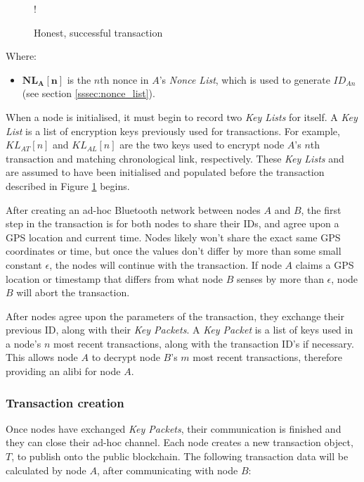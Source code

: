 \begin{figure}[H]
\resizebox {\columnwidth} {!} {}
\caption{Honest, successful transaction}
\label{fig:transaction}
\end{figure}

Where:
\begin{itemize}[noitemsep,topsep=0pt]
	\item[] $\mathbf{NL_A[n]}$ is the $n$th nonce in $A$'s \textit{Nonce List}, which is used to generate $ID_{An}$ (see section \ref{sssec:nonce_list}).
\end{itemize}

\null
When a node is initialised, it must begin to record two \textit{Key Lists} for itself. A \textit{Key List} is a list of encryption keys previously used for transactions. For example, $KL_{AT}[n]$ and $KL_{AL}[n]$ are the two keys used to encrypt node $A$'s $n$th transaction and matching chronological link, respectively. These \textit{Key Lists} and are assumed to have been initialised and populated before the transaction described in Figure \ref{fig:transaction} begins.

After creating an ad-hoc Bluetooth network between nodes $A$ and $B$, the first step in the transaction is for both nodes to share their IDs, and agree upon a GPS location and current time. Nodes likely won't share the exact same GPS coordinates or time, but once the values don't differ by more than some small constant $\epsilon$, the nodes will continue with the transaction. If node $A$ claims a GPS location or timestamp that differs from what node $B$ senses by more than $\epsilon$, node $B$ will abort the transaction.

After nodes agree upon the parameters of the transaction, they exchange their previous ID, along with their \textit{Key Packets}. A \textit{Key Packet} is a list of keys used in a node's $n$ most recent transactions, along with the transaction ID's if necessary. This allows node $A$ to decrypt node $B$'s $m$ most recent transactions, therefore providing an alibi for node $A$.

\subsubsection{Transaction creation}
Once nodes have exchanged \textit{Key Packets}, their communication is finished and they can close their ad-hoc channel. Each node creates a new transaction object, $T$, to publish onto the public blockchain. The following transaction data will be calculated by node $A$, after communicating with node $B$:
\\

